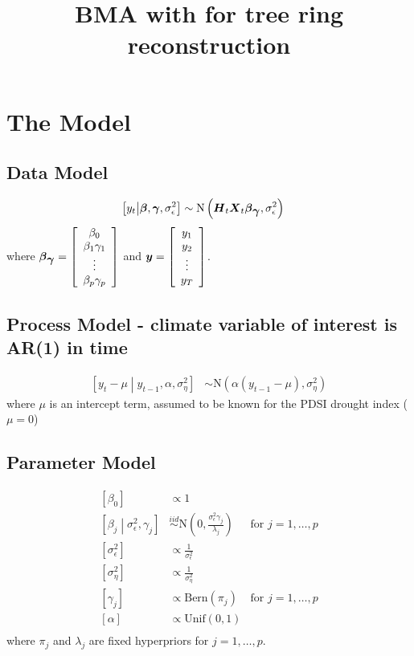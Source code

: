 \documentclass[fleqn]{article}
\title{BMA with for tree ring reconstruction}
\def\bm#1{\mbox{\boldmath $#1$}}
\begin{document}
\section{The Model}
\subsection{Data Model}
%
%
\begin{align*}
%
\left[ y_t \middle| \bm{\beta}, \bm{\gamma}, \sigma^2_\epsilon \right] & \sim \mbox{N}\left( \bm{H}_t \bm{X}_t \bm{\beta}_{\bm{\gamma}}, \sigma^2_\epsilon \right)
%
\end{align*}
%
where $\bm{\beta}_{\bm{\gamma}} = \left[ \begin{array}{c}
\beta_0 \\
\beta_1 \gamma_1 \\
\vdots \\
\beta_p \gamma_p \\
\end{array} \right] $ and $\bm{y} = \left[ \begin{array}{c}
y_1 \\
y_2 \\
\vdots \\
y_T \\
\end{array} \right]$.
\subsection{Process Model - climate variable of interest is AR(1) in time}
%
\begin{align*}
%
\left[ y_t - \mu \middle| y_{t - 1}, \alpha, \sigma^2_\eta \right] & \sim \mbox{N}\left( \alpha \left( y_{t - 1} - \mu \right), \sigma^2_\eta \right)
%
\end{align*}
%
where $\mu$ is an intercept term, assumed to be known for the PDSI drought index ($\mu = 0$)
\subsection{Parameter Model}
\begin{align*}
%
\left[ \beta_0 \right] & \propto 1 \\
%
\left[ \beta_{j} \middle| \sigma^2_\epsilon, \gamma_j \right] & \stackrel{iid} {\sim} 
\mbox{N}\left( 0, \frac{\sigma^2_\epsilon \gamma_j} {\lambda_j} \right) & \mbox{for } j = 1, \ldots , p \\
%
\left[ \sigma^2_\epsilon \right] & \propto \frac{1} {\sigma^2_\epsilon} \\
%
\left[ \sigma^2_\eta \right] & \propto \frac{1} {\sigma^2_\eta} \\
%
\left[ \gamma_{j} \right] & \propto \mbox{Bern} \left( \pi_j \right) & \mbox{for } j = 1, \ldots, p \\
%
\left[ \alpha \right] & \propto \mbox{Unif} \left( 0, 1 \right) \\
%
\end{align*}
where $\pi_j$ and $\lambda_j$ are fixed hyperpriors for $j = 1, \ldots, p$. 
%
\end{document}
